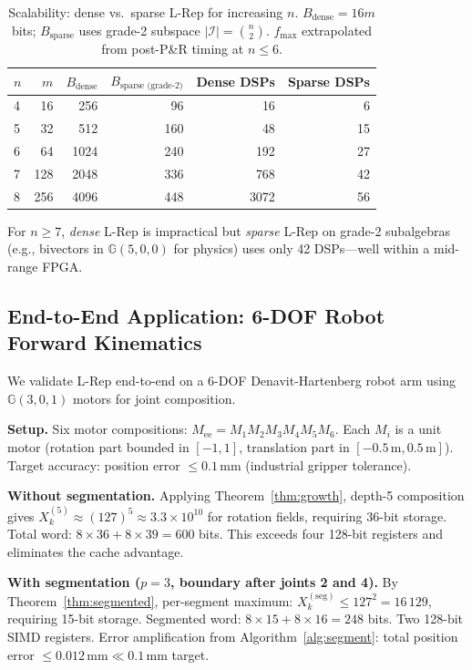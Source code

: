 \documentclass[11pt,a4paper]{article}
\theoremstyle{definition}
\theoremstyle{plain}
\theoremstyle{remark}
\newcommand{\GA}{\mathbb{G}}
\begin{document}
\begin{table}[h]
\centering
\caption{Scalability: dense vs.\ sparse L-Rep for increasing $n$.
$B_\text{dense} = 16m$ bits; $B_\text{sparse}$ uses grade-2 subspace
$|\mathcal{I}| = \binom{n}{2}$.
$f_{\max}$ extrapolated from post-P\&R timing at $n \le 6$.}
\label{tab:scale}
\begin{tabular}{lrrrrr}
\toprule
$n$ & $m$ & $B_\text{dense}$ & $B_\text{sparse (grade-2)}$ & Dense DSPs & Sparse DSPs \\
\midrule
4 & 16 & 256 & 96 & 16 & 6 \\
5 & 32 & 512 & 160 & 48 & 15 \\
6 & 64 & 1024 & 240 & 192 & 27 \\
7 & 128 & 2048 & 336 & 768 & 42 \\
8 & 256 & 4096 & 448 & 3072 & 56 \\
\bottomrule
\end{tabular}
\end{table}

For $n \ge 7$, \emph{dense} L-Rep is impractical but
\emph{sparse} L-Rep on grade-2 subalgebras (e.g., bivectors in
$\GA(5,0,0)$ for physics) uses only 42 DSPs---well within a
mid-range FPGA.

\subsection{End-to-End Application: 6-DOF Robot Forward Kinematics}
\label{sec:app-robot}

We validate L-Rep end-to-end on a 6-DOF Denavit-Hartenberg robot
arm using $\GA(3,0,1)$ motors for joint composition.

\textbf{Setup.}
Six motor compositions:
$M_\text{ee} = M_1 M_2 M_3 M_4 M_5 M_6$.
Each $M_i$ is a unit motor (rotation part bounded in $[-1,1]$,
translation part in $[-0.5\,\text{m}, 0.5\,\text{m}]$).
Target accuracy: position error $\le 0.1\,\text{mm}$ (industrial gripper tolerance).

\textbf{Without segmentation.}
Applying Theorem~\ref{thm:growth}, depth-5 composition gives
$X_k^{(5)} \approx (127)^5 \approx 3.3 \times 10^{10}$ for rotation
fields, requiring 36-bit storage.
Total word: $8 \times 36 + 8 \times 39 = 600$ bits.
This exceeds four 128-bit registers and eliminates the cache advantage.

\textbf{With segmentation ($p = 3$, boundary after joints 2 and 4).}
By Theorem~\ref{thm:segmented}, per-segment maximum:
$X_k^{(\text{seg})} \le 127^2 = 16\,129$, requiring 15-bit storage.
Segmented word: $8 \times 15 + 8 \times 16 = 248$ bits.
Two 128-bit SIMD registers.
Error amplification from Algorithm~\ref{alg:segment}:
total position error $\le 0.012\,\text{mm} \ll 0.1\,\text{mm}$ target.
\end{document}
